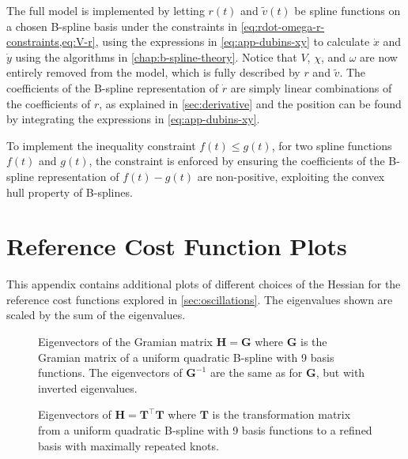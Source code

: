 The full model is implemented by letting $r(t)$ and $\tilde v(t)$ be spline functions on a chosen B-spline basis under the constraints in \cref{eq:rdot-omega-r-constraints,eq:V-r}, using the expressions in \cref{eq:app-dubins-xy} to calculate $\dot x$ and $\dot y$ using the algorithms in \cref{chap:b-spline-theory}. Notice that $V$, $\chi$, and $\omega$ are now entirely removed from the model, which is fully described by $r$ and $\tilde v$. The coefficients of the B-spline representation of $\dot r$ are simply linear combinations of the coefficients of $r$, as explained in \cref{sec:derivative} and the position can be found by integrating the expressions in \cref{eq:app-dubins-xy}.

To implement the inequality constraint $f(t) \le g(t)$, for two spline functions $f(t)$ and $g(t)$, the constraint is enforced by ensuring the coefficients of the B-spline representation of $f(t) - g(t)$ are non-positive, exploiting the convex hull property of B-splines. 




\chapter{Reference Cost Function Plots}\label{app:reference-cost-plots}


This appendix contains additional plots of different choices of the Hessian for the reference cost functions explored in \cref{sec:oscillations}. The eigenvalues shown are scaled by the sum of the eigenvalues.

\begin{figure}
    \centering
    
    \caption{Eigenvectors of the Gramian matrix $\mathbf H = \mathbf G$ where $\mathbf G$ is the Gramian matrix of a uniform quadratic B-spline with 9 basis functions. The eigenvectors of $\mathbf G^{-1}$ are the same as for $\mathbf G$, but with inverted eigenvalues.}
    \label{fig:integral-basis-eigenvectors-9}
\end{figure}


\begin{figure}
    \centering
    
    \caption{Eigenvectors of $\mathbf H = \mathbf T^\top \mathbf T$ where $\mathbf T$ is the transformation matrix from a uniform quadratic B-spline with 9 basis functions to a refined basis with maximally repeated knots.}
    \label{fig:refined-basis-eigenvectors-9}
\end{figure} 

